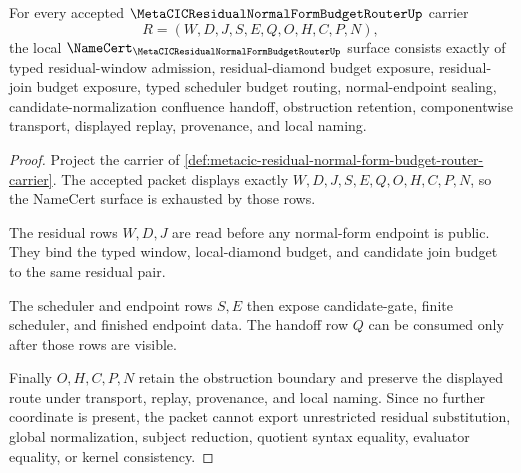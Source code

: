 \begin{theorem}
\label{thm:metacic-residual-normal-form-budget-router-obligations}
For every accepted $\MetaCICResidualNormalFormBudgetRouterUp$ carrier
$$
R=(W,D,J,S,E,Q,O,H,C,P,N),
$$
the local $\NameCert_{\MetaCICResidualNormalFormBudgetRouterUp}$ surface consists exactly of typed residual-window admission, residual-diamond budget exposure, residual-join budget exposure, typed scheduler budget routing, normal-endpoint sealing, candidate-normalization confluence handoff, obstruction retention, componentwise transport, displayed replay, provenance, and local naming.
\end{theorem}
\begin{proof}
Project the carrier of \autoref{def:metacic-residual-normal-form-budget-router-carrier}. The accepted packet displays exactly $W,D,J,S,E,Q,O,H,C,P,N$, so the NameCert surface is exhausted by those rows.

The residual rows $W,D,J$ are read before any normal-form endpoint is public. They bind the typed window, local-diamond budget, and candidate join budget to the same residual pair.

The scheduler and endpoint rows $S,E$ then expose candidate-gate, finite scheduler, and finished endpoint data. The handoff row $Q$ can be consumed only after those rows are visible.

Finally $O,H,C,P,N$ retain the obstruction boundary and preserve the displayed route under transport, replay, provenance, and local naming. Since no further coordinate is present, the packet cannot export unrestricted residual substitution, global normalization, subject reduction, quotient syntax equality, evaluator equality, or kernel consistency.
\end{proof}


